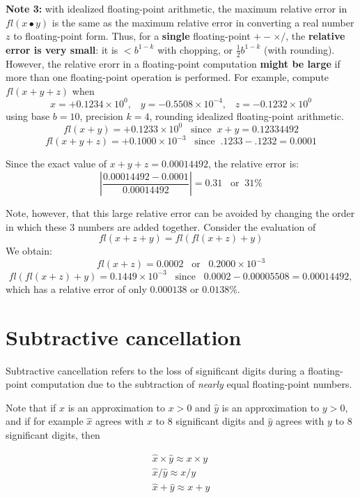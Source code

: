 \documentclass [titlepage,12pt,letter] {article}
\begin{document}
{\bf Note 3:} with idealized floating-point arithmetic, the maximum relative error in $fl(x \bullet y)$ is the same as the maximum relative error in converting a real number $z$ to floating-point form. Thus, for a {\bf single} floating-point $+ - \times /$, the {\bf relative error is very small}: it is $ < b^{1-k}$ with chopping, or $\frac{1}{2} b^{1-k}$ (with rounding). However, the relative erorr in a floating-point computation {\bf might be large} if more than one floating-point operation is performed. For example, compute $fl(x + y + z)$ when 
\[ 
x = + 0.1234 \times 10 ^0, \;\;\; y = -0.5508 \times 10^{-4}, \;\;\; z = -0.1232 \times 10^0 
\]
\noindent 
using base $b=10$, precision $k=4$, rounding idealized floating-point arithmetic. 
\[
fl(x+y) = + 0.1233 \times 10^0\;\;\; \mbox{since} \;\; x +y = 0.12334492
\] 
\[
fl(x+y+z) = +0.1000 \times 10^{-3} \;\;\; \mbox{since} \;\; .1233 - .1232 = 0.0001 
\] 

\noindent 
Since the exact value of $x+y+z = 0.00014492$, the relative error is: 
\[ 
\left| \frac{0.00014492 - 0.0001}{0.00014492} \right| = 0.31 \;\;\; \mbox{or} \;\; 31\%
\] 

Note, however, that this large relative error can be avoided by changing the order in which these 3 numbers are added together. Consider the evaluation of 
\[
fl(x+z+y) = fl(fl(x+z)+y)
\]
\noindent 
We obtain: 
\[
fl(x+z) = 0.0002 \;\;\; \mbox{or} \;\;\; 0.2000\times 10^{-3} 
\]
\[
fl(fl(x+z)+y) = 0.1449 \times 10^{-3} \;\;\; \mbox{since} \;\;\; 0.0002 - 0.00005508 = 0.00014492, 
\]
\noindent 
which has a relative error of only $0.000138$ or $0.0138\%$. 

\section{Subtractive cancellation}
Subtractive cancellation refers to the loss of significant digits during a floating-point computation due to the subtraction of {\it nearly} equal floating-point numbers. 

Note that if $\hat{x}$ is an approximation to $x>0$ and $\hat{y}$ is an approximation to $y>0$, and if for example $\hat{x}$ agrees with $x$ to 8 significant digits and $\hat{y}$ agrees with $y$ to 8 significant digits, then

\begin{align*}
\hat{x} \times \hat{y} \approx x \times y \\
\hat{x}/\hat{y} \approx x/y \\
\hat{x} + \hat{y} \approx x + y
\end{align*}
\end{document}
